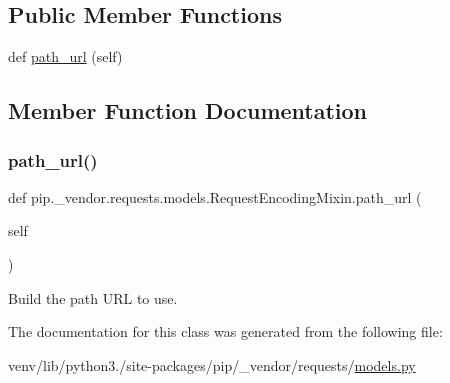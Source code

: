 \subsection*{Public Member Functions}
\begin{DoxyCompactItemize}
\item 
def \hyperlink{classpip_1_1__vendor_1_1requests_1_1models_1_1RequestEncodingMixin_ac09adc28031a61a73a7deb9ce1af261f}{path\+\_\+url} (self)
\end{DoxyCompactItemize}


\subsection{Member Function Documentation}
\mbox{\label{classpip_1_1__vendor_1_1requests_1_1models_1_1RequestEncodingMixin_ac09adc28031a61a73a7deb9ce1af261f}} 
\subsubsection{\texorpdfstring{path\+\_\+url()}{path\_url()}}
{\footnotesize\ttfamily def pip.\+\_\+vendor.\+requests.\+models.\+Request\+Encoding\+Mixin.\+path\+\_\+url (\begin{DoxyParamCaption}\item[{}]{self }\end{DoxyParamCaption})}

\begin{DoxyVerb}Build the path URL to use.\end{DoxyVerb}
 

The documentation for this class was generated from the following file\+:\begin{DoxyCompactItemize}
\item 
venv/lib/python3./site-\/packages/pip/\+\_\+vendor/requests/\hyperlink{__vendor_2requests_2models_8py}{models.\+py}\end{DoxyCompactItemize}
